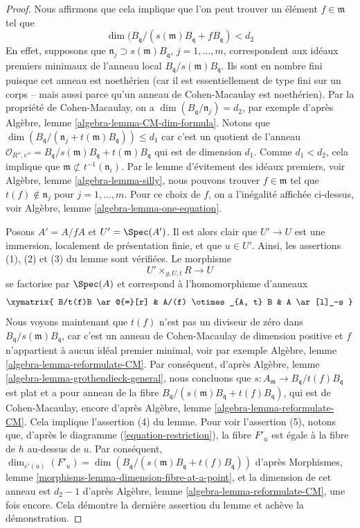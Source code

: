 \begin{proof}
\medskip\noindent
Nous affirmons que cela implique que l'on peut trouver
un élément $f \in \mathfrak m$ tel que
$$
\dim(B_{\mathfrak q}/(s(\mathfrak m)B_{\mathfrak q} + fB_{\mathfrak q}) < d_2
$$
En effet, supposons que $\mathfrak n_j \supset s(\mathfrak m)B_{\mathfrak q}$,
$j = 1, \ldots, m$, correspondent aux idéaux premiers minimaux de l'anneau local
$B_{\mathfrak q}/s(\mathfrak m)B_{\mathfrak q}$.
Ils sont en nombre fini puisque cet anneau est noethérien (car il est essentiellement
de type fini sur un corps -- mais aussi parce qu'un anneau de Cohen-Macaulay est
noethérien). Par la propriété de Cohen-Macaulay, on a
$\dim(B_{\mathfrak q}/\mathfrak n_j) = d_2$, par exemple d'après
Algèbre, lemme \ref{algebra-lemma-CM-dim-formula}.
Notons que
$\dim(B_{\mathfrak q}/(\mathfrak n_j + t(\mathfrak m)B_{\mathfrak q}))
\leq d_1$
car c'est un quotient de l'anneau
$\mathcal{O}_{R'', e''} =
B_{\mathfrak q}/s(\mathfrak m)B_{\mathfrak q} + t(\mathfrak m)B_{\mathfrak q}$
qui est de dimension $d_1$. Comme $d_1 < d_2$, cela implique que
$\mathfrak m \not \subset t^{-1}(\mathfrak n_i)$.
Par le lemme d'évitement des idéaux premiers, voir
Algèbre, lemme \ref{algebra-lemma-silly},
nous pouvons trouver $f \in \mathfrak m$ tel que $t(f) \not \in \mathfrak n_j$ pour
$j = 1, \ldots, m$. Pour ce choix de $f$, on a
l'inégalité affichée ci-dessus, voir
Algèbre, lemme \ref{algebra-lemma-one-equation}.

\medskip\noindent
Posons $A' = A/fA$ et $U' = \Spec(A')$. Il est alors clair que
$U' \to U$ est une immersion, localement de présentation finie,
et que $u \in U'$. Ainsi, les assertions (1), (2) et (3) du lemme sont vérifiées.
Le morphisme
$$
U' \times_{g, U, t} R \longrightarrow U
$$
se factorise par $\Spec(A)$ et correspond à l'homomorphisme d'anneaux
$$
\xymatrix{
B/t(f)B \ar@{=}[r] & A/(f) \otimes_{A, t} B & A \ar[l]_-s
}
$$
Nous voyons maintenant que $t(f)$ n'est pas un diviseur de zéro dans
$B_{\mathfrak q}/s(\mathfrak m)B_{\mathfrak q}$, car c'est un anneau de
Cohen-Macaulay de dimension positive et $f$ n'appartient à
aucun idéal premier minimal, voir par exemple
Algèbre, lemme \ref{algebra-lemma-reformulate-CM}.
Par conséquent, d'après
Algèbre, lemme \ref{algebra-lemma-grothendieck-general},
nous concluons que $s : A_{\mathfrak m} \to B_{\mathfrak q}/t(f)B_{\mathfrak q}$
est plat et a pour anneau de la fibre
$B_{\mathfrak q}/(s(\mathfrak m)B_{\mathfrak q} + t(f)B_{\mathfrak q})$,
qui est de Cohen-Macaulay, encore d'après
Algèbre, lemme \ref{algebra-lemma-reformulate-CM}.
Cela implique l'assertion (4) du lemme.
Pour voir l'assertion (5), notons que, d'après le diagramme (\ref{equation-restriction}),
la fibre $F'_u$ est égale à la fibre de $h$ au-dessus de $u$.
Par conséquent,
$\dim_{e'(u)}(F'_u) =
\dim(B_{\mathfrak q}/(s(\mathfrak m)B_{\mathfrak q} + t(f)B_{\mathfrak q}))$
d'après
Morphismes, lemme \ref{morphisms-lemma-dimension-fibre-at-a-point},
et la dimension de cet anneau est $d_2 - 1$ d'après
Algèbre, lemme \ref{algebra-lemma-reformulate-CM},
une fois encore. Cela démontre la dernière assertion du lemme et achève la démonstration.
\end{proof}


